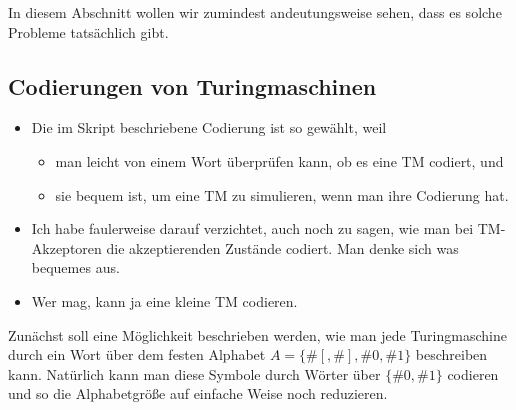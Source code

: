 In diesem Abschnitt wollen wir zumindest andeutungsweise sehen, dass
es solche Probleme tatsächlich gibt.

\Tut\subsection{Codierungen von Turingmaschinen}
\label{subsec:cod-tm}

\begin{tutorium}
  \begin{itemize}
  \item Die im Skript beschriebene Codierung ist so gewählt, weil
    \begin{itemize}
    \item man leicht von einem Wort überprüfen kann, ob es eine TM
      codiert, und
    \item sie bequem ist, um eine TM zu simulieren, wenn man ihre
      Codierung hat.
    \end{itemize}
  \item Ich habe faulerweise darauf verzichtet, auch noch zu sagen,
    wie man bei TM-Akzeptoren die akzeptierenden Zustände
    codiert. Man denke sich was bequemes aus.
  \item Wer mag, kann ja eine kleine TM codieren.
  \end{itemize}
\end{tutorium}
Zunächst soll eine Möglichkeit beschrieben werden, wie man jede
Turingmaschine durch ein Wort über dem festen Alphabet $A=\{\#[, \#],
\#0, \#1\}$ beschreiben kann. Natürlich kann man diese Symbole durch
Wörter über $\{\#0, \#1\}$ codieren und so die Alphabetgröße auf
einfache Weise noch reduzieren.

